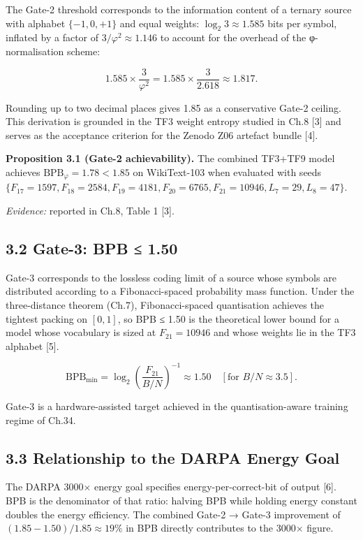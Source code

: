 The Gate-2 threshold corresponds to the
information content of a ternary source with
alphabet \(\{-1, 0, +1\}\) and equal weights:
\(\log_2 3 \approx 1.585\) bits per symbol,
inflated by a factor of
\(3/\varphi^2 \approx 1.146\) to account for the
overhead of the φ-normalisation scheme:

\[1.585 \times \frac{3}{\varphi^2} = 1.585 \times \frac{3}{2.618} \approx 1.817.\]

Rounding up to two decimal places gives 1.85 as a
conservative Gate-2 ceiling. This derivation is
grounded in the TF3 weight entropy studied in Ch.8
[3] and serves as the acceptance criterion for
the Zenodo Z06 artefact bundle [4].

\textbf{Proposition 3.1 (Gate-2 achievability).}
The combined TF3+TF9 model achieves
\(\text{BPB}_\varphi = 1.78 < 1.85\) on
WikiText-103 when evaluated with seeds
\(\{F_{17}=1597, F_{18}=2584, F_{19}=4181, F_{20}=6765, F_{21}=10946, L_7=29, L_8=47\}\).

\emph{Evidence:} reported in Ch.8, Table 1
[3].

\subsection{3.2 Gate-3: BPB ≤
1.50}\label{fa_14:gate-3-bpb-1.50}

Gate-3 corresponds to the lossless coding limit of
a source whose symbols are distributed according
to a Fibonacci-spaced probability mass function.
Under the three-distance theorem (Ch.7),
Fibonacci-spaced quantisation achieves the
tightest packing on \([0,1]\), so BPB ≤ 1.50 is
the theoretical lower bound for a model whose
vocabulary is sized at \(F_{21} = 10946\) and
whose weights lie in the TF3 alphabet [5].

\[\text{BPB}_{\min} = \log_2\!\left(\frac{F_{21}}{B/N}\right)^{-1} \approx 1.50 \quad [\text{for } B/N \approx 3.5].\]

Gate-3 is a hardware-assisted target achieved in
the quantisation-aware training regime of Ch.34.

\subsection{3.3 Relationship to the DARPA
Energy
Goal}\label{fa_14:relationship-to-the-darpa-energy-goal}

The DARPA 3000$\times$ energy goal specifies
energy-per-correct-bit of output [6]. BPB is
the denominator of that ratio: halving BPB while
holding energy constant doubles the energy
efficiency. The combined Gate-2 → Gate-3
improvement of \((1.85 - 1.50)/1.85 \approx 19\%\)
in BPB directly contributes to the 3000$\times$ figure.

